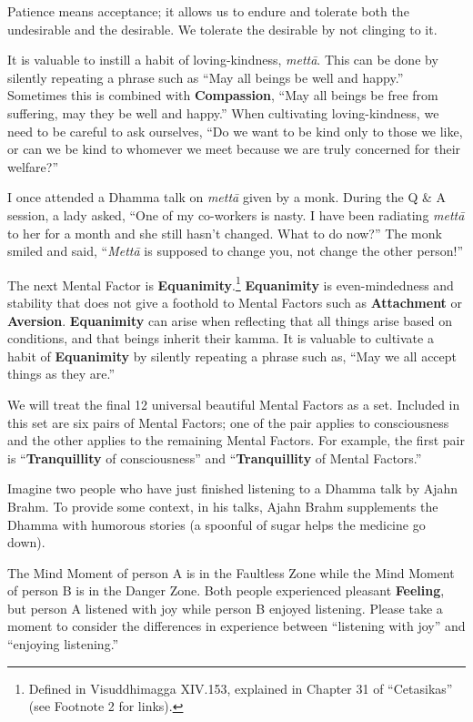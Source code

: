 Patience means acceptance; it allows us to endure and tolerate both the undesirable and the desirable. We tolerate the desirable by not clinging to it.

It is valuable to instill a habit of loving-kindness, \textit{mettā}. This can be done by silently repeating a phrase such as “May all beings be well and happy.” Sometimes this is combined with \textbf{Compassion}, “May all beings be free from suffering, may they be well and happy.” When cultivating loving-kindness, we need to be careful to ask ourselves, “Do we want to be kind only to those we like, or can we be kind to whomever we meet because we are truly concerned for their welfare?”

I once attended a Dhamma talk on \textit{mettā} given by a monk. During the Q \& A session, a lady asked, “One of my co-workers is nasty. I have been radiating \textit{mettā} to her for a month and she still hasn’t changed. What to do now?” The monk smiled and said, “\textit{Mettā} is supposed to change you, not change the other person!”

The next Mental Factor is \textbf{Equanimity}.\footnote{Defined in Visuddhimagga XIV.153, explained in Chapter 31 of “Cetasikas” (see Footnote 2 for links).} \textbf{Equanimity} is even-mindedness and stability that does not give a foothold to Mental Factors such as \textbf{Attachment} or \textbf{Aversion}. \textbf{Equanimity} can arise when reflecting that all things arise based on conditions, and that beings inherit their kamma. It is valuable to cultivate a habit of \textbf{Equanimity} by silently repeating a phrase such as, “May we all accept things as they are.”

\pagebreak

We will treat the final 12 universal beautiful Mental Factors as a set. Included in this set are six pairs of Mental Factors; one of the pair applies to consciousness and the other applies to the remaining Mental Factors. For example, the first pair is “\textbf{Tranquillity} of consciousness” and “\textbf{Tranquillity} of Mental Factors.”

Imagine two people who have just finished listening to a Dhamma talk by Ajahn Brahm. To provide some context, in his talks, Ajahn Brahm supplements the Dhamma with humorous stories (a spoonful of sugar helps the medicine go down).

The Mind Moment of person A is in the Faultless Zone while the Mind Moment of person B is in the Danger Zone. Both people experienced pleasant \textbf{Feeling}, but person A listened with joy while person B enjoyed listening. Please take a moment to  consider the differences in experience between “listening with joy” and “enjoying listening.”

